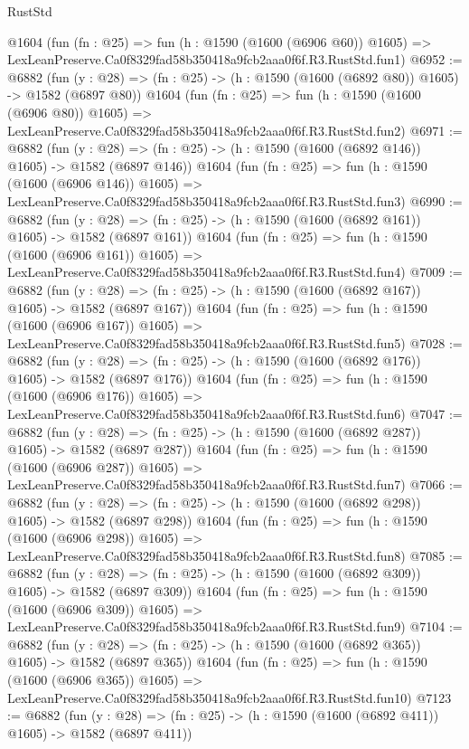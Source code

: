 \begin{lexlean}{RustStd}
\begin{coremodule}
    @1604
    (fun (fn : @25) =>
    fun (h : @1590 (@1600 (@6906 @60)) @1605) =>
    LexLeanPreserve.Ca0f8329fad58b350418a9fcb2aaa0f6f.R3.RustStd.fun1)
@6952 := @6882
    (fun (y : @28) => (fn : @25) -> (h : @1590 (@1600 (@6892 @80)) @1605) -> @1582 (@6897 @80))
    @1604
    (fun (fn : @25) =>
    fun (h : @1590 (@1600 (@6906 @80)) @1605) =>
    LexLeanPreserve.Ca0f8329fad58b350418a9fcb2aaa0f6f.R3.RustStd.fun2)
@6971 := @6882
    (fun (y : @28) => (fn : @25) -> (h : @1590 (@1600 (@6892 @146)) @1605) -> @1582 (@6897 @146))
    @1604
    (fun (fn : @25) =>
    fun (h : @1590 (@1600 (@6906 @146)) @1605) =>
    LexLeanPreserve.Ca0f8329fad58b350418a9fcb2aaa0f6f.R3.RustStd.fun3)
@6990 := @6882
    (fun (y : @28) => (fn : @25) -> (h : @1590 (@1600 (@6892 @161)) @1605) -> @1582 (@6897 @161))
    @1604
    (fun (fn : @25) =>
    fun (h : @1590 (@1600 (@6906 @161)) @1605) =>
    LexLeanPreserve.Ca0f8329fad58b350418a9fcb2aaa0f6f.R3.RustStd.fun4)
@7009 := @6882
    (fun (y : @28) => (fn : @25) -> (h : @1590 (@1600 (@6892 @167)) @1605) -> @1582 (@6897 @167))
    @1604
    (fun (fn : @25) =>
    fun (h : @1590 (@1600 (@6906 @167)) @1605) =>
    LexLeanPreserve.Ca0f8329fad58b350418a9fcb2aaa0f6f.R3.RustStd.fun5)
@7028 := @6882
    (fun (y : @28) => (fn : @25) -> (h : @1590 (@1600 (@6892 @176)) @1605) -> @1582 (@6897 @176))
    @1604
    (fun (fn : @25) =>
    fun (h : @1590 (@1600 (@6906 @176)) @1605) =>
    LexLeanPreserve.Ca0f8329fad58b350418a9fcb2aaa0f6f.R3.RustStd.fun6)
@7047 := @6882
    (fun (y : @28) => (fn : @25) -> (h : @1590 (@1600 (@6892 @287)) @1605) -> @1582 (@6897 @287))
    @1604
    (fun (fn : @25) =>
    fun (h : @1590 (@1600 (@6906 @287)) @1605) =>
    LexLeanPreserve.Ca0f8329fad58b350418a9fcb2aaa0f6f.R3.RustStd.fun7)
@7066 := @6882
    (fun (y : @28) => (fn : @25) -> (h : @1590 (@1600 (@6892 @298)) @1605) -> @1582 (@6897 @298))
    @1604
    (fun (fn : @25) =>
    fun (h : @1590 (@1600 (@6906 @298)) @1605) =>
    LexLeanPreserve.Ca0f8329fad58b350418a9fcb2aaa0f6f.R3.RustStd.fun8)
@7085 := @6882
    (fun (y : @28) => (fn : @25) -> (h : @1590 (@1600 (@6892 @309)) @1605) -> @1582 (@6897 @309))
    @1604
    (fun (fn : @25) =>
    fun (h : @1590 (@1600 (@6906 @309)) @1605) =>
    LexLeanPreserve.Ca0f8329fad58b350418a9fcb2aaa0f6f.R3.RustStd.fun9)
@7104 := @6882
    (fun (y : @28) => (fn : @25) -> (h : @1590 (@1600 (@6892 @365)) @1605) -> @1582 (@6897 @365))
    @1604
    (fun (fn : @25) =>
    fun (h : @1590 (@1600 (@6906 @365)) @1605) =>
    LexLeanPreserve.Ca0f8329fad58b350418a9fcb2aaa0f6f.R3.RustStd.fun10)
@7123 := @6882
    (fun (y : @28) => (fn : @25) -> (h : @1590 (@1600 (@6892 @411)) @1605) -> @1582 (@6897 @411))

\end{coremodule}
\end{lexlean}

